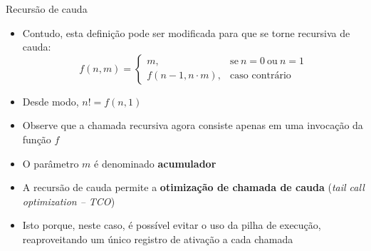 \begin{frame}[fragile]{Recursão de cauda}

    \begin{itemize}
        \item Contudo, esta definição pode ser modificada para que se torne recursiva de cauda:
        \[
            f(n, m) = \left\lbrace \begin{array}{ll} m,& \mbox{se}\ n = 0\ \mbox{ou}\ n = 1 \\
                f(n - 1, n\cdot m),& \mbox{caso contrário} \end{array}\right.
        \]

        \item Desde modo, $n! = f(n, 1)$

        \item Observe que a chamada recursiva agora consiste apenas em uma invocação da função
            $f$

        \item O parâmetro $m$ é denominado \textbf{acumulador}

        \item A recursão de cauda permite a \textbf{otimização de chamada de cauda}
            (\textit{tail call optimization -- TCO})

        \item Isto porque, neste caso, é possível evitar o uso da pilha de execução, reaproveitando
            um único registro de ativação a cada chamada
    \end{itemize}

\end{frame}

